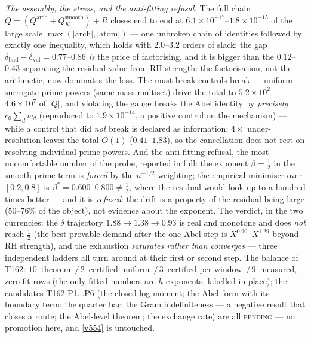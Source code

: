 \documentclass[11pt,a4paper]{article}
\begin{document}
\emph{The assembly, the stress, and the anti-fitting refusal.} The full chain
$Q=(Q^{\mathrm{arch}}+Q^{\mathrm{smooth}}_K)+R$ closes end to end at
$6.1\times10^{-17}$--$1.8\times10^{-15}$ of the large scale
$\max(|\mathrm{arch}|,|\mathrm{atom}|)$ --- one unbroken chain of identities
followed by exactly one inequality, which holds with $2.0$--$3.2$ orders of
slack; the gap $\delta_{\mathrm{bnd}}-\delta_{\mathrm{val}}=0.77$--$0.86$
\emph{is} the price of factorising, and it is bigger than the $0.12$--$0.43$
separating the residual value from RH strength: the factorisation, not the
arithmetic, now dominates the loss. The must-break controls break --- uniform
surrogate prime powers (same mass multiset) drive the total to
$5.2\times10^{2}$--$4.6\times10^{7}$ of $|Q|$, and violating the gauge breaks
the Abel identity by \emph{precisely} $c_0\sum_dw_d$ (reproduced to
$1.9\times10^{-14}$, a positive control on the mechanism) --- while a control
that did \emph{not} break is declared as information: $4\times$
under-resolution leaves the total $O(1)$ ($0.41$--$1.83$), so the cancellation
does not rest on resolving individual prime powers. And the anti-fitting
refusal, the most uncomfortable number of the probe, reported in full: the
exponent $\beta=\tfrac12$ in the smooth prime term is \emph{forced} by the
$n^{-1/2}$ weighting; the empirical minimiser over $[0.2,0.8]$ is
$\beta^*=0.600$--$0.800\ne\tfrac12$, where the residual would look up to a
hundred times better --- and it is \emph{refused}: the drift is a property of
the residual being large ($50$--$76\%$ of the object), not evidence about the
exponent. The verdict, in the two currencies: the $\delta$ trajectory
$1.88\to1.38\to0.93$ is real and monotone and does \emph{not} reach $\tfrac12$
(the best provable demand after the one Abel step is $X^{0.90}$--$X^{1.29}$
beyond RH strength), and the exhaustion \emph{saturates rather than
converges} --- three independent ladders all turn around at their first or
second step. The balance of T162: $10$~theorem~$/\,2$~certified-uniform~$/\,
3$~certified-per-window~$/\,9$~measured, zero fit rows (the only fitted numbers
are $h$-exponents, labelled in place); the candidates T162-P1$\ldots$P6 (the
closed log-moment; the Abel form with its boundary term; the quarter bar; the
Gram indefiniteness --- a negative result that closes a route; the Abel-level
theorem; the exchange rate) are all \textsc{pending} --- no promotion here, and
\vref{v554} is untouched.
\end{document}
